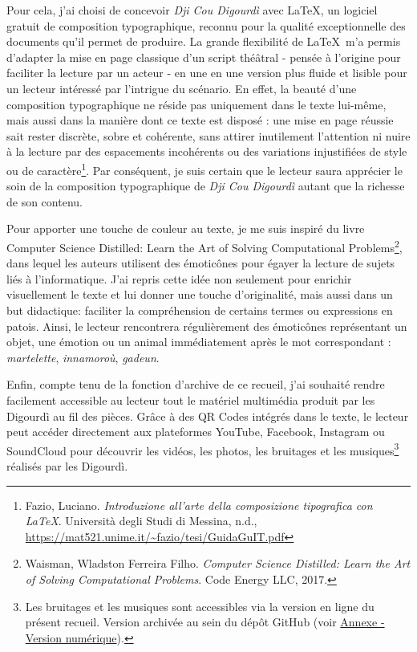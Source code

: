 Pour cela, j'ai choisi de concevoir \textit{Dji Cou Digourdì} avec \LaTeX, un logiciel gratuit de composition typographique, reconnu pour la qualité exceptionnelle des documents qu’il permet de produire. La grande flexibilité de \LaTeX\ m’a permis d’adapter la mise en page classique d’un script théâtral - pensée à l’origine pour faciliter la lecture par un acteur - en une en une version plus fluide et lisible pour un lecteur intéressé par l’intrigue du scénario. En effet, la beauté d’une composition typographique ne réside pas uniquement dans le texte lui-même, mais aussi dans la manière dont ce texte est disposé : une mise en page réussie sait rester discrète, sobre et cohérente, sans attirer inutilement l’attention ni nuire à la lecture par des espacements incohérents ou des variations injustifiées de style ou de caractère\footnote{ Fazio, Luciano. \textit{Introduzione all'arte della composizione tipografica con LaTeX}. Università degli Studi di Messina, n.d., \url{https://mat521.unime.it/~fazio/tesi/GuidaGuIT.pdf}}. Par conséquent, je suis certain que le lecteur saura apprécier le soin de la composition typographique de \textit{Dji Cou Digourdì} autant que la richesse de son contenu.

Pour apporter une touche de couleur au texte, je me suis inspiré du livre \og Computer Science Distilled: Learn the Art of Solving Computational Problems\fg\footnote{ Waisman, Wladston Ferreira Filho. \textit{Computer Science Distilled: Learn the Art of Solving Computational Problems}. Code Energy LLC, 2017.}, dans lequel les auteurs utilisent des émoticônes pour égayer la lecture de sujets liés à l'informatique. J'ai repris cette idée non seulement pour enrichir visuellement le texte et lui donner une touche d'originalité, mais aussi dans un but didactique: faciliter la compréhension de certains termes ou expressions en patois. Ainsi, le lecteur rencontrera régulièrement des émoticônes représentant un objet, une émotion ou un animal immédiatement après le mot correspondant : \textit{martelette}\martello, \textit{innamoroù}\inamourou, \textit{gadeun}\gadeun.

Enfin, compte tenu de la fonction d'archive de ce recueil, j'ai souhaité rendre facilement accessible au lecteur tout le matériel multimédia produit par les Digourdì au fil des pièces. Grâce à des QR Codes intégrés dans le texte, le lecteur peut accéder directement aux plateformes YouTube, Facebook, Instagram ou SoundCloud pour découvrir les vidéos, les photos, les bruitages et les musiques\footnote{ Les bruitages et les musiques sont accessibles via la version en ligne du présent recueil. Version archivée au sein du dépôt GitHub (voir \hyperref[vers_num]{Annexe - Version numérique}).} réalisés par les Digourdì.

